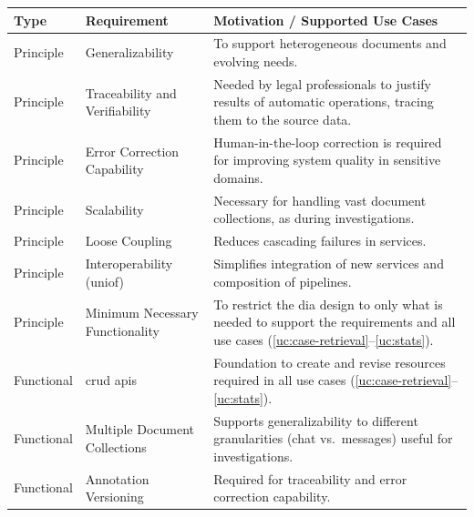 %
\begin{table}[htbp!]
\centering
{}
\begin{tabularx}{\textwidth}{p{2cm}p{4.5cm}X}
\toprule
\textbf{Type} & \textbf{Requirement} & \textbf{Motivation / Supported Use Cases} \\%
\midrule
Principle &
Generalizability &
To support heterogeneous documents and evolving needs. \\%

Principle &
Traceability and Verifiability &
Needed by legal professionals to justify results of automatic operations, tracing them to the source data. \\%

Principle &
Error Correction Capability &
Human-in-the-loop correction is required for improving system quality in sensitive domains. \\%

Principle &
Scalability &
Necessary for handling vast document collections, as during investigations. \\%


Principle &
Loose Coupling &
Reduces cascading failures in services. \\%

Principle &
Interoperability (\ac{uniof}) &
Simplifies integration of new services and composition of pipelines. \\%

Principle &
Minimum Necessary Functionality &
To restrict the \ac{dia} design to only what is needed to support the requirements and all use cases
(\ref{uc:case-retrieval}--\ref{uc:stats}). \\%
\midrule
Functional &
\Ac{crud} \acp{api} &
Foundation to create and revise resources required in all use cases
(\ref{uc:case-retrieval}--\ref{uc:stats}). \\%

Functional &
Multiple Document Collections &
Supports generalizability to different granularities (chat vs.\ messages) useful for investigations. \\%

Functional &
Annotation Versioning &
Required for traceability and error correction capability. \\%


\end{tabularx}
\end{table}
